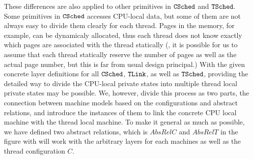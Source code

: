 These differences are also applied to 
other primitives in ${{\mathrm{\texttt{CSched}}}}$ and ${{\mathrm{\texttt{TSched}}}}$.
Some primitives in ${{\mathrm{\texttt{CSched}}}}$ accesses CPU-local data, but some of them 
are not always easy to divide them clearly for each thread. 
Pages in the memory, for example, 
can be dynamicaly allocated, thus 
each thread does not know exactly 
which pages are associated with the thread statically
(\ie, it is possible for us to assume that each thread statically 
reserve the number of pages as well as 
the actual page number, but this is far from usual design principal.)
With the given concrete layer definitions for 
all ${{\mathrm{\texttt{CSched}}}}$, ${{\mathrm{\texttt{TLink}}}}$, as well as ${{\mathrm{\texttt{TSched}}}}$,
providing the detailed 
way to divide the CPU-local private states into multiple thread local private states 
may be possible. 
We, however, divide this process 
as two parts, the connection between machine models based on the configurations and abstract relations, 
and introduce the instances of them to link the concrete CPU local machine with 
the thread local machine. 
To make it general as much as possible, 
we have defined two abstract relations, 
which is $AbsRelC$ and $AbsRelT$ in the figure with will work 
with the arbitrary layers for each machines as well as the thread configuration $C$. 


%

